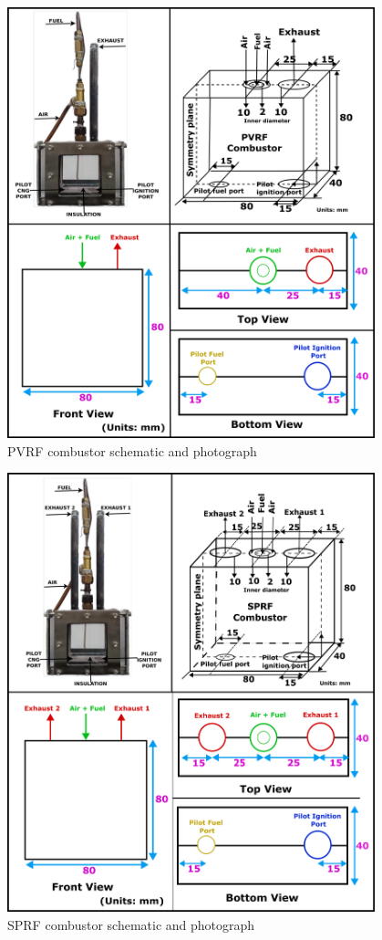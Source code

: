 \begin{figure}[h]
	\centering
	\includegraphics[width=0.95\textwidth]{Chapter4/Images/PVRF_Lab.png}
	\caption{PVRF combustor schematic and photograph}
	\label{PVRF-geometry}
\end{figure}
\begin{figure}[h]
	\centering
	\includegraphics[width=0.95\textwidth]{Chapter4/Images/SPRF_Lab.png}
	\caption{SPRF combustor schematic and photograph}
	\label{SPRF-geometry}
\end{figure}
